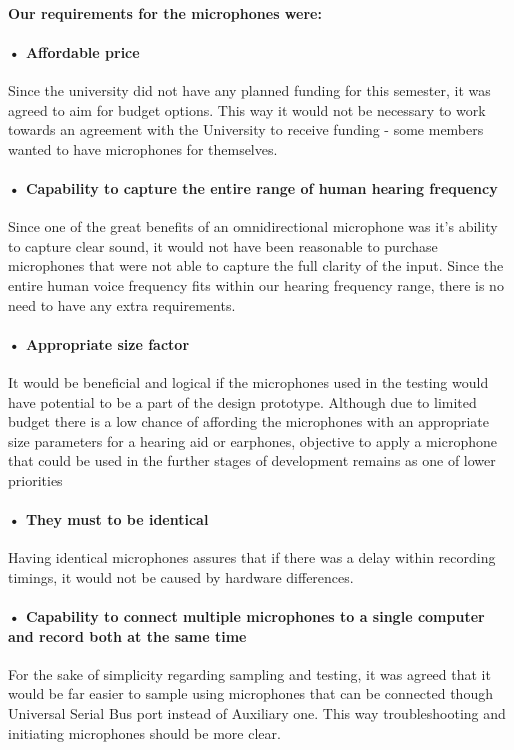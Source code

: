 \paragraph{Our requirements for the microphones were: \\}

\paragraph{• Affordable price\\}   
Since the university did not have any planned funding for this semester, it was agreed to aim for budget options. This way it would not be necessary to work towards an agreement with the University to receive funding - some members wanted to have microphones for themselves.
\paragraph{• Capability to capture the entire range of human hearing frequency\\}   
Since one of the great benefits of an omnidirectional microphone was it's ability to capture clear sound, it would not have been reasonable to purchase microphones that were not able to capture the full clarity of the input. Since the entire human voice frequency fits within our hearing frequency range, there is no need to have any extra requirements.
\paragraph{• Appropriate size factor\\}    
It would be beneficial and logical if the microphones used in the testing would have potential to be a part of the design prototype. Although due to limited budget there is a low chance of affording the microphones with an appropriate size parameters for a hearing aid or earphones, objective to apply a microphone that could be used in the further stages of development remains as one of lower priorities    
\paragraph{• They must to be identical\\}    
Having identical microphones assures that if there was a delay within recording timings, it would not be caused by hardware differences.
\paragraph{• Capability to connect multiple microphones to a single computer and record both at the same time\\}   
For the sake of simplicity regarding sampling and testing, it was agreed that it would be far easier to sample using microphones that can be connected though Universal Serial Bus port instead of Auxiliary one. This way troubleshooting and initiating microphones should be more clear. 

